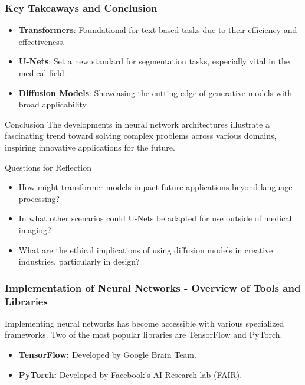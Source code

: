 \documentclass[aspectratio=169]{beamer}
\begin{document}
\begin{frame}[fragile]
    \frametitle{Key Takeaways and Conclusion}
    
    \begin{itemize}
        \item \textbf{Transformers}: Foundational for text-based tasks due to their efficiency and effectiveness.
        \item \textbf{U-Nets}: Set a new standard for segmentation tasks, especially vital in the medical field.
        \item \textbf{Diffusion Models}: Showcasing the cutting-edge of generative models with broad applicability.
    \end{itemize}

    \begin{block}{Conclusion}
        The developments in neural network architectures illustrate a fascinating trend toward solving complex problems across various domains, inspiring innovative applications for the future.
    \end{block}
    
    \begin{block}{Questions for Reflection}
        \begin{itemize}
            \item How might transformer models impact future applications beyond language processing?
            \item In what other scenarios could U-Nets be adapted for use outside of medical imaging?
            \item What are the ethical implications of using diffusion models in creative industries, particularly in design?
        \end{itemize}
    \end{block}
\end{frame}

\begin{frame}[fragile]
    \frametitle{Implementation of Neural Networks - Overview of Tools and Libraries}
    Implementing neural networks has become accessible with various specialized frameworks. 
    Two of the most popular libraries are TensorFlow and PyTorch.
    \begin{itemize}
        \item \textbf{TensorFlow:} Developed by Google Brain Team.
        \item \textbf{PyTorch:} Developed by Facebook's AI Research lab (FAIR).
    \end{itemize}
\end{frame}
\end{document}
